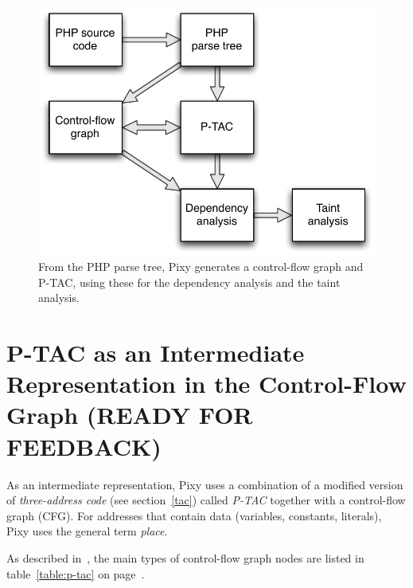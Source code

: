 \begin{figure}[htb]
 \includegraphics[scale=0.8]{images/Pixy-Arbeitsweise}
 \caption{From the PHP parse tree, Pixy generates a control-flow graph and P-TAC, using these for the dependency analysis and the taint analysis.}
 \label{fig:pixy-data-structures}
\end{figure}

\section{P-TAC as an Intermediate Representation in the Control-Flow Graph (READY FOR FEEDBACK)}
\label{p-tac}

As an intermediate representation, Pixy uses a combination of a modified version of \emph{three-address code} (see section~\ref{tac}) called \emph{P-TAC} together with a control-flow graph (CFG). For addresses that contain data (variables, constants, literals), Pixy uses the general term \emph{place}.

As described in~\cite{pixy-dissertation}, the main types of control-flow graph nodes are listed in table~\ref{table:p-tac} on page~\pageref{table:p-tac}.

